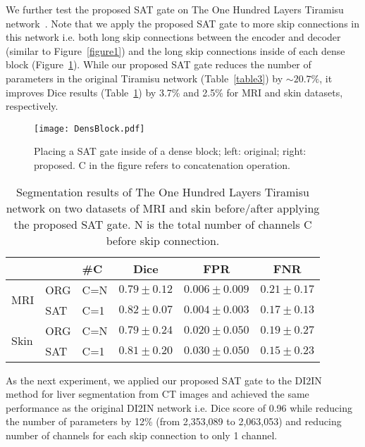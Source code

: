 \documentclass{article}
\begin{document}
We further test the proposed SAT gate on The One Hundred Layers Tiramisu network~\cite{jegou2017one}. Note that we apply the proposed SAT gate to more skip connections in this network i.e. both long skip connections between the encoder and decoder (similar to Figure~\ref{figure1}) and the long skip connections inside of each dense block (Figure~\ref{densblock}). While our proposed SAT gate reduces the number of parameters in the original Tiramisu network (Table~\ref{table3}) by $\sim20.7\%$, it improves Dice results (Table~\ref{tiramisu}) by 3.7\% and 2.5\% for MRI and skin datasets, respectively.


\begin{figure}[h]
\centering
\texttt{[image: DensBlock.pdf]}
\caption{Placing a SAT gate inside of a dense block; left: original; right: proposed. C in the figure refers to concatenation operation.}
\label{densblock}
\end{figure}


\begin{table}[h]
\small
\setlength{\tabcolsep}{6pt}
\centering
\caption{Segmentation results of The One Hundred Layers Tiramisu network on two datasets of MRI and skin before/after applying the proposed SAT gate. N is the total number of channels C before skip connection.}
\label{tiramisu}
\begin{tabular}{lllccc}
\hline
                      &     & \#C & Dice          & FPR             & FNR           \\ \hline
\multirow{2}{*}{MRI}  & ORG & C=N & $0.79\pm0.12$ & $0.006\pm0.009$ & $0.21\pm0.17$ \\
                      & SAT & C=1 & $0.82\pm0.07$ & $0.004\pm0.003$ & $0.17\pm0.13$ \\ \hline
\multirow{2}{*}{Skin} & ORG & C=N & $0.79\pm0.24$ & $0.020\pm0.050$ & $0.19\pm0.27$ \\
                      & SAT & C=1 & $0.81\pm0.20$ & $0.030\pm0.050$  & $0.15\pm0.23$ \\ \hline
\end{tabular}
\end{table}

As the next experiment, we applied our proposed SAT gate to the DI2IN~\cite{yang2017automatic} method for liver segmentation from CT images and achieved the same performance as the original DI2IN network i.e.  Dice score of 0.96 while reducing the number of parameters by 12\% (from 2,353,089 to 2,063,053) and reducing number of channels for each skip connection to only 1 channel.
\end{document}
